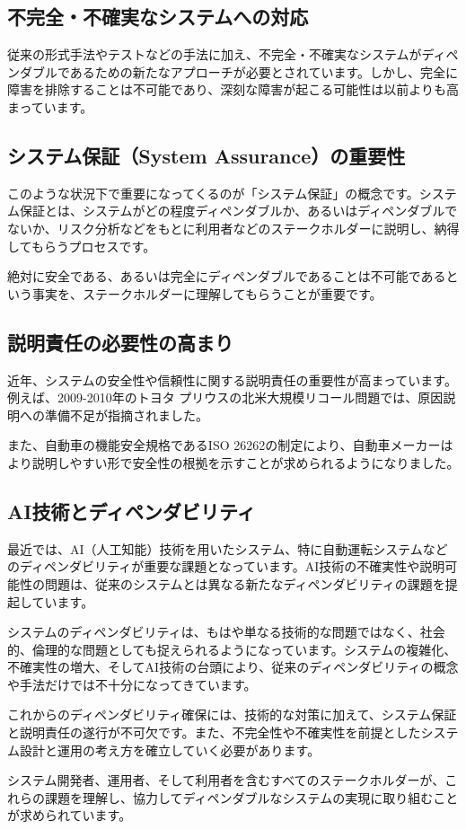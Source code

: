 \subsection{不完全・不確実なシステムへの対応}

従来の形式手法やテストなどの手法に加え、不完全・不確実なシステムがディペンダブルであるための新たなアプローチが必要とされています。しかし、完全に障害を排除することは不可能であり、深刻な障害が起こる可能性は以前よりも高まっています。

\subsection{システム保証（System Assurance）の重要性}

このような状況下で重要になってくるのが「システム保証」の概念です。システム保証とは、システムがどの程度ディペンダブルか、あるいはディペンダブルでないか、リスク分析などをもとに利用者などのステークホルダーに説明し、納得してもらうプロセスです。

絶対に安全である、あるいは完全にディペンダブルであることは不可能であるという事実を、ステークホルダーに理解してもらうことが重要です。

\subsection{説明責任の必要性の高まり}

近年、システムの安全性や信頼性に関する説明責任の重要性が高まっています。例えば、2009-2010年のトヨタ プリウスの北米大規模リコール問題では、原因説明への準備不足が指摘されました。

また、自動車の機能安全規格であるISO 26262の制定により、自動車メーカーはより説明しやすい形で安全性の根拠を示すことが求められるようになりました。

\subsection{AI技術とディペンダビリティ}

最近では、AI（人工知能）技術を用いたシステム、特に自動運転システムなどのディペンダビリティが重要な課題となっています。AI技術の不確実性や説明可能性の問題は、従来のシステムとは異なる新たなディペンダビリティの課題を提起しています。


システムのディペンダビリティは、もはや単なる技術的な問題ではなく、社会的、倫理的な問題としても捉えられるようになっています。システムの複雑化、不確実性の増大、そしてAI技術の台頭により、従来のディペンダビリティの概念や手法だけでは不十分になってきています。

これからのディペンダビリティ確保には、技術的な対策に加えて、システム保証と説明責任の遂行が不可欠です。また、不完全性や不確実性を前提としたシステム設計と運用の考え方を確立していく必要があります。

システム開発者、運用者、そして利用者を含むすべてのステークホルダーが、これらの課題を理解し、協力してディペンダブルなシステムの実現に取り組むことが求められています。